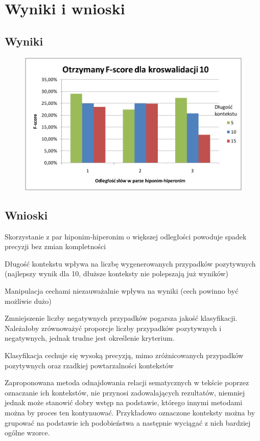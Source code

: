 \documentclass[a4paper,10pt]{report}
\begin{document}
\chapter{Wyniki i wnioski}

\section{Wyniki}

\begin{figure}[h]
\centering
 \includegraphics[width=13cm]{img/image003.png}
 \caption{}
\label{fig:wykres}
\end{figure} 

\section{Wnioski}

Skorzystanie z par hiponim-hiperonim o większej odległości powoduje spadek precyzji bez zmian kompletności

Długość kontekstu wpływa na liczbę wygenerowanych przypadków pozytywnych (najlepszy wynik dla 10, dłuższe konteksty nie polepszają już wyników)

Manipulacja cechami niezauważalnie wpływa na wyniki (cech powinno być możliwie dużo)

Zmniejszenie liczby negatywnych przypadków pogarsza jakość klasyfikacji. Należałoby zrównoważyć proporcje liczby przypadków pozytywnych i negatywnych, jednak trudne jest określenie kryterium.


Klasyfikacja cechuje się wysoką precyzją, mimo zróżnicowanych przypadków pozytywnych oraz rzadkiej powtarzalności kontekstów

Zaproponowana metoda odnajdowania relacji sematycznych w tekście poprzez oznaczanie ich kontekstów, nie przynosi zadowalających rezultatów, niemniej jednak może stanowić dobry wstęp na podstawie, którego innymi metodami można by proces ten kontynuować. Przykładowo oznaczone konteksty można by grupować na podstawie ich podobieństwa a następnie wyciągać z nich bardziej ogólne wzorce.


\nocite{*}

\end{document}
